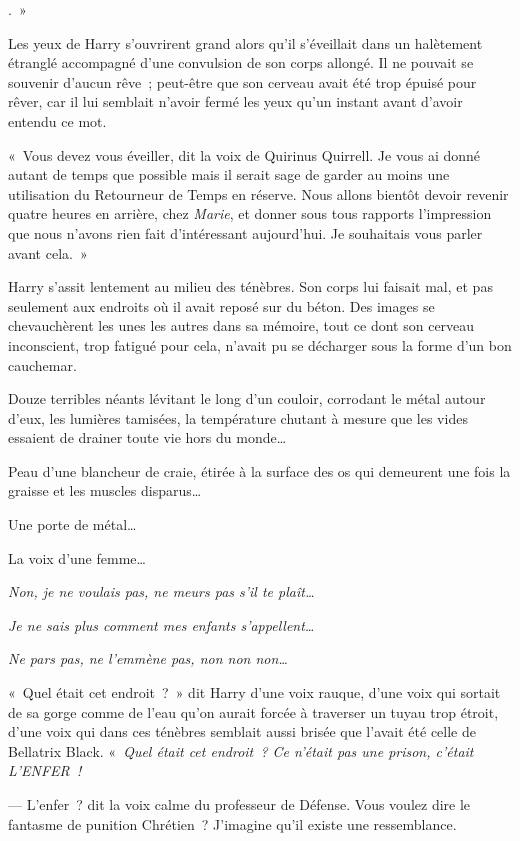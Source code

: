
.~»

\hplettrineextrapara
Les yeux de Harry s'ouvrirent grand alors qu'il s'éveillait dans un halètement étranglé accompagné d'une convulsion de son corps allongé. Il ne pouvait se souvenir d'aucun rêve~; peut-être que son cerveau avait été trop épuisé pour rêver, car il lui semblait n'avoir fermé les yeux qu'un instant avant d'avoir entendu ce mot.

«~Vous devez vous éveiller, dit la voix de Quirinus Quirrell. Je vous ai donné autant de temps que possible mais il serait sage de garder au moins une utilisation du Retourneur de Temps en réserve. Nous allons bientôt devoir revenir quatre heures en arrière, chez \emph{Marie}, et donner sous tous rapports l'impression que nous n'avons rien fait d'intéressant aujourd'hui. Je souhaitais vous parler avant cela.~»

Harry s'assit lentement au milieu des ténèbres. Son corps lui faisait mal, et pas seulement aux endroits où il avait reposé sur du béton. Des images se chevauchèrent les unes les autres dans sa mémoire, tout ce dont son cerveau inconscient, trop fatigué pour cela, n'avait pu se décharger sous la forme d'un bon cauchemar.

Douze terribles néants lévitant le long d'un couloir, corrodant le métal autour d'eux, les lumières tamisées, la température chutant à mesure que les vides essaient de drainer toute vie hors du monde…

Peau d'une blancheur de craie, étirée à la surface des os qui demeurent une fois la graisse et les muscles disparus…

Une porte de métal…

La voix d'une femme…

\emph{Non, je ne voulais pas, ne meurs pas s'il te plaît…}

\emph{Je ne sais plus comment mes enfants s'appellent…}

\emph{Ne pars pas, ne l'emmène pas, non non non…}

«~Quel était cet endroit~?~» dit Harry d'une voix rauque, d'une voix qui sortait de sa gorge comme de l'eau qu'on aurait forcée à traverser un tuyau trop étroit, d'une voix qui dans ces ténèbres semblait aussi brisée que l'avait été celle de Bellatrix Black. «~\emph{Quel était cet endroit~? Ce n'était pas une prison, c'était L'ENFER~!}

--- L'enfer~? dit la voix calme du professeur de Défense. Vous voulez dire le fantasme de punition Chrétien~? J'imagine qu'il existe une ressemblance.

